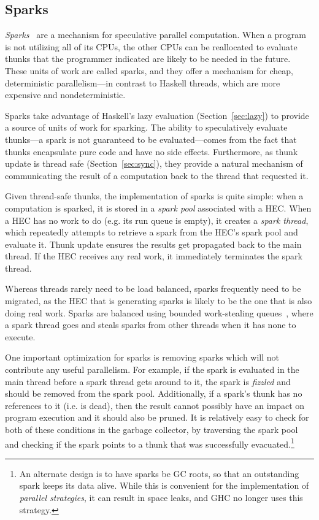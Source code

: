 \subsection{Sparks}
\label{sec:sparks}

\emph{Sparks}~\cite{Marlow2009} are a mechanism for speculative parallel computation.
When a program is not utilizing all of its CPUs, the other CPUs can be
reallocated to evaluate thunks that the programmer indicated are likely
to be needed in the future.  These units of work are called sparks, and
they offer a mechanism for cheap, deterministic parallelism---in contrast to
Haskell threads, which are more expensive and nondeterministic.

Sparks take advantage of Haskell's lazy evaluation (Section~\ref{sec:lazy}) to provide a source
of units of work for sparking.  The ability to speculatively evaluate
thunks---a spark is not guaranteed to be evaluated---comes from the fact
that thunks encapsulate pure code and have no side effects.
Furthermore, as thunk update is thread safe (Section~\ref{sec:sync}),
they provide a natural mechanism of communicating the result of a
computation back to the thread that requested it.

Given thread-safe thunks, the implementation of sparks is quite simple:
when a computation is sparked, it is stored in a \emph{spark pool}
associated with a HEC.  When a HEC has no work to do (e.g.
its run queue is empty), it creates a \emph{spark thread}, which
repeatedly attempts to retrieve a spark from the HEC's spark pool
and evaluate it.  Thunk update ensures the results get propagated back
to the main thread. If the HEC receives any real work, it
immediately terminates the spark thread.

Whereas threads rarely need to be load balanced, sparks frequently need
to be migrated, as the HEC that is generating sparks is likely to
be the one that is also doing real work.  Sparks are balanced using
bounded work-stealing queues~\cite{Arora:1998:TSM:277651.277678,Hendler2005}, where a spark thread goes and steals
sparks from other threads when it has none to execute.

One important optimization for sparks is removing sparks which will not
contribute any useful parallelism.  For example, if the spark is
evaluated in the main thread before a spark thread gets around to it,
the spark is \emph{fizzled} and should be removed from the spark pool.
Additionally, if a spark's thunk has no references to it (i.e. is dead),
then the result cannot possibly have an impact on program execution and
it should also be pruned.  It is relatively easy to check for both of
these conditions in the garbage collector, by traversing the spark pool
and checking if the spark points to a thunk that was successfully evacuated.\footnote{An alternate design is to have sparks be GC roots, so that an outstanding spark keeps its data alive. While this is convenient for the implementation of \emph{parallel strategies}, it can result in space leaks, and GHC no longer uses this strategy.}

